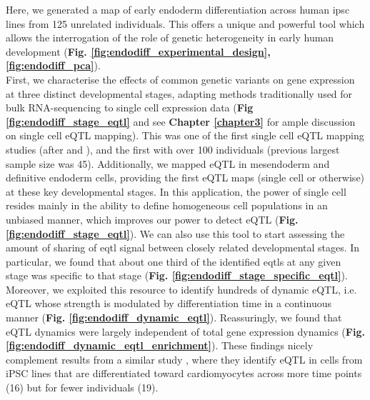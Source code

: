 

Here, we generated a map of early endoderm differentiation across human \gls{ipsc} lines from 125 unrelated individuals.
This offers a unique and powerful tool which allows the interrogation of the role of genetic heterogeneity in early human development (\textbf{Fig. \ref{fig:endodiff_experimental_design}, \ref{fig:endodiff_pca}}). \\

First, we characterise the effects of common genetic variants on gene expression at three distinct developmental stages, adapting methods traditionally used for bulk RNA-sequencing to single cell expression data (\textbf{Fig \ref{fig:endodiff_stage_eqtl}} and see \textbf{Chapter 
\ref{chapter3}}
for ample discussion on single cell eQTL mapping).
This was one of the first single cell eQTL mapping studies (after \cite{wills2013single} and \cite{van2018single}), and the first with over 100 individuals (previous largest sample size was 45).
Additionally, we mapped eQTL in mesendoderm and definitive endoderm cells, providing the first eQTL maps (single cell or otherwise) at these key developmental stages. 
In this application, the power of single cell resides mainly in the ability to define homogeneous cell populations in an unbiased manner, which improves our power to detect eQTL (\textbf{Fig. \ref{fig:endodiff_stage_eqtl}}).
We can also use this tool to start assessing the amount of sharing of \gls{eqtl} signal between closely related developmental stages.
In particular, we found that about one third of the identified \glspl{eqtl} at any given stage was specific to that stage (\textbf{Fig. \ref{fig:endodiff_stage_specific_eqtl}}).\\

Moreover, we exploited this resource to identify hundreds of dynamic eQTL, i.e. eQTL whose strength is modulated by differentiation time in a continuous manner (\textbf{Fig. \ref{fig:endodiff_dynamic_eqtl}}).
Reassuringly, we found that eQTL dynamics were largely independent of total gene expression dynamics (\textbf{Fig. \ref{fig:endodiff_dynamic_eqtl_enrichment}}).
These findings nicely complement results from a similar study \cite{strober2019dynamic}, where they identify eQTL in cells from iPSC lines that are differentiated toward cardiomyocytes across more time points (16) but for fewer individuals (19).\\


